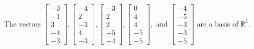 \begin{exercise}
\begin{exerciseStatement}
  \end{exerciseStatement}
  \begin{exerciseAnswer}
   The vectors \(\left[\begin{array}{r}
-3 \\
-1 \\
3 \\
-4 \\
-3
\end{array}\right] , \left[\begin{array}{r}
-4 \\
2 \\
-3 \\
4 \\
-3
\end{array}\right] , \left[\begin{array}{r}
-3 \\
2 \\
2 \\
-5 \\
-4
\end{array}\right] , \left[\begin{array}{r}
0 \\
4 \\
4 \\
-5 \\
-5
\end{array}\right] , \text{ and } \left[\begin{array}{r}
-4 \\
-5 \\
-3 \\
-3 \\
-5
\end{array}\right]\) 
  	 are  a basis of \(\mathbb{R}^5\).
  


  \end{exerciseAnswer}
\end{exercise}